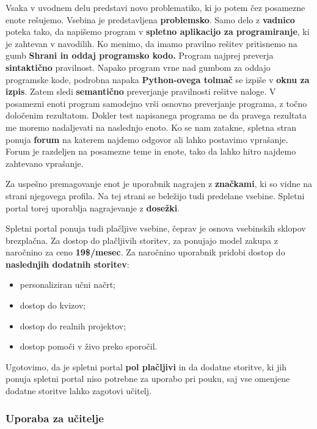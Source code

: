 Vsaka v uvodnem delu predstavi novo problematiko, ki jo potem čez
posamezne enote rešujemo. Vsebina je predstavljena
\textbf{problemsko}. Samo delo z \textbf{vadnico} poteka tako, da
napišemo program v \textbf{spletno aplikacijo za programiranje}, ki je
zahtevan v navodilih. Ko menimo, da imamo pravilno rešitev pritisnemo
na gumb \textbf{Shrani in oddaj programsko kodo.} Program najprej
preverja \textbf{sintaktično} pravilnost. Napako program vrne nad
gumbom za oddajo programske kode, podrobna napaka \textbf{Python-ovega
  tolmač} se izpiše v \textbf{oknu za izpis}. Zatem sledi
\textbf{semantično} preverjanje pravilnosti rešitve naloge. V
posamezni enoti program samodejno vrši osnovno preverjanje programa, z
točno določenim rezultatom. Dokler test napisanega programa ne da
pravega rezultata me moremo nadaljevati na naslednjo enoto. Ko se nam
zatakne, spletna stran ponuja \textbf{forum} na katerem najdemo
odgovor ali lahko postavimo vprašanje. Forum je razdeljen na posamezne
teme in enote, tako da lahko hitro najdemo zahtevano vprašanje.

Za uspešno premagovanje enot je uporabnik nagrajen z
\textbf{značkami}, ki so vidne na strani njegovega profila. Na tej
strani se beležijo tudi predelane vsebine. Spletni portal torej
uporablja nagrajevanje z \textbf{dosežki}.

Spletni portal ponuja tudi plačljive vsebine, čeprav je osnova
vsebinskih sklopov brezplačna. Za dostop do plačljivih storitev, za
ponujajo model zakupa z naročnino za ceno \textbf{19\$/mesec}. Za
naročnino uporabnik pridobi dostop do\textbf{ naslednjih dodatnih
  storitev}:

\begin{itemize}
\item personaliziran učni načrt;
\item dostop do kvizov;
\item dostop do realnih projektov;
\item dostop pomoči v živo preko sporočil.
\end{itemize}

Ugotovimo, da je spletni portal \textbf{pol plačljivi} in da dodatne
storitve, ki jih ponuja spletni portal niso potrebne za uporabo pri
pouku, saj vse omenjene dodatne storitve lahko zagotovi učitelj.

\subsubsection{Uporaba za učitelje}
\label{sec:uporaba_učitelji}

